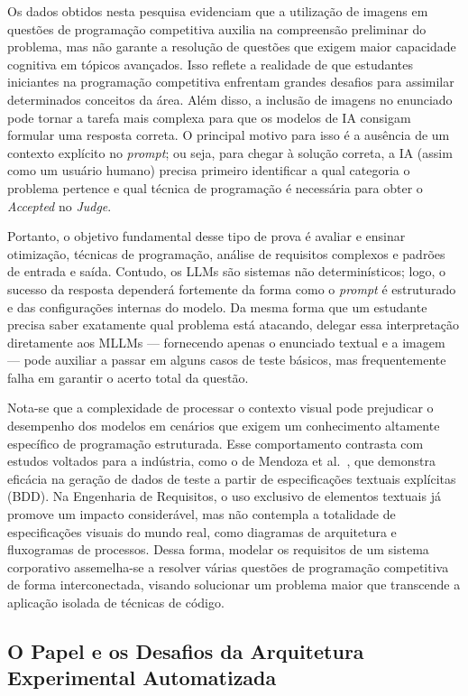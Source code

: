 \documentclass[sigconf,anonymous]{acmart} %
\begin{document}
Os dados obtidos nesta pesquisa evidenciam que a utilização de imagens em questões de programação competitiva auxilia na compreensão preliminar do problema, mas não garante a resolução de questões que exigem maior capacidade cognitiva em tópicos avançados. Isso reflete a realidade de que estudantes iniciantes na programação competitiva enfrentam grandes desafios para assimilar determinados conceitos da área. Além disso, a inclusão de imagens no enunciado pode tornar a tarefa mais complexa para que os modelos de IA consigam formular uma resposta correta. O principal motivo para isso é a ausência de um contexto explícito no \textit{prompt}; ou seja, para chegar à solução correta, a IA (assim como um usuário humano) precisa primeiro identificar a qual categoria o problema pertence e qual técnica de programação é necessária para obter o \textit{Accepted} no \textit{Judge}.

Portanto, o objetivo fundamental desse tipo de prova é avaliar e ensinar otimização, técnicas de programação, análise de requisitos complexos e padrões de entrada e saída. Contudo, os LLMs são sistemas não determinísticos; logo, o sucesso da resposta dependerá fortemente da forma como o \textit{prompt} é estruturado e das configurações internas do modelo. Da mesma forma que um estudante precisa saber exatamente qual problema está atacando, delegar essa interpretação diretamente aos MLLMs --- fornecendo apenas o enunciado textual e a imagem --- pode auxiliar a passar em alguns casos de teste básicos, mas frequentemente falha em garantir o acerto total da questão.

Nota-se que a complexidade de processar o contexto visual pode prejudicar o desempenho dos modelos em cenários que exigem um conhecimento altamente específico de programação estruturada. Esse comportamento contrasta com estudos voltados para a indústria, como o de Mendoza et al.~\cite{Mendoza2024Comparative}, que demonstra eficácia na geração de dados de teste a partir de especificações textuais explícitas (BDD). Na Engenharia de Requisitos, o uso exclusivo de elementos textuais já promove um impacto considerável, mas não contempla a totalidade de especificações visuais do mundo real, como diagramas de arquitetura e fluxogramas de processos. Dessa forma, modelar os requisitos de um sistema corporativo assemelha-se a resolver várias questões de programação competitiva de forma interconectada, visando solucionar um problema maior que transcende a aplicação isolada de técnicas de código.

\subsection{O Papel e os Desafios da Arquitetura Experimental Automatizada}
\end{document}

